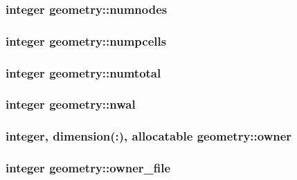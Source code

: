 \hypertarget{classgeometry_a74e7aa9e5207d1bdf0ec33642daa1e95}{
\subsubsection[{numnodes}]{\setlength{\rightskip}{0pt plus 5cm}integer geometry\-::numnodes}}\label{classgeometry_a74e7aa9e5207d1bdf0ec33642daa1e95}
\hypertarget{classgeometry_abe73a7c15a5676edffcb997de320903b}{
\subsubsection[{numpcells}]{\setlength{\rightskip}{0pt plus 5cm}integer geometry\-::numpcells}}\label{classgeometry_abe73a7c15a5676edffcb997de320903b}
\hypertarget{classgeometry_a4b36c67fd5fbba66cd159331a6449464}{
\subsubsection[{numtotal}]{\setlength{\rightskip}{0pt plus 5cm}integer geometry\-::numtotal}}\label{classgeometry_a4b36c67fd5fbba66cd159331a6449464}
\hypertarget{classgeometry_a3e083890c7aae9c07961696766208796}{
\subsubsection[{nwal}]{\setlength{\rightskip}{0pt plus 5cm}integer geometry\-::nwal}}\label{classgeometry_a3e083890c7aae9c07961696766208796}
\hypertarget{classgeometry_ae59df205a86f69d3cc7ecf9917b3fc8d}{
\subsubsection[{owner}]{\setlength{\rightskip}{0pt plus 5cm}integer, dimension(\-:), allocatable geometry\-::owner}}\label{classgeometry_ae59df205a86f69d3cc7ecf9917b3fc8d}
\hypertarget{classgeometry_aa4904f087664ad6358d283ca2e053b0f}{
\subsubsection[{owner\-\_\-file}]{\setlength{\rightskip}{0pt plus 5cm}integer geometry\-::owner\-\_\-file}}\label{classgeometry_aa4904f087664ad6358d283ca2e053b0f}
